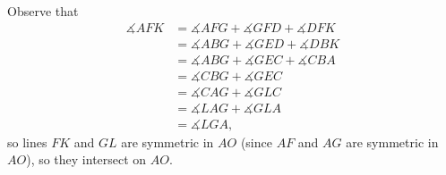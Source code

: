 Observe that
\begin{align*}
\measuredangle{AFK}&=\measuredangle{AFG}+\measuredangle{GFD}+\measuredangle{DFK}\\
&=\measuredangle{ABG}+\measuredangle{GED}+\measuredangle{DBK}\\
&=\measuredangle{ABG}+\measuredangle{GEC}+\measuredangle{CBA}\\
&=\measuredangle{CBG}+\measuredangle{GEC}\\
&=\measuredangle{CAG}+\measuredangle{GLC}\\
&=\measuredangle{LAG}+\measuredangle{GLA}\\
&=\measuredangle{LGA},
\end{align*}
so lines $FK$ and $GL$ are symmetric in $AO$ (since $AF$ and $AG$ are symmetric in $AO$), so they intersect on $AO$.